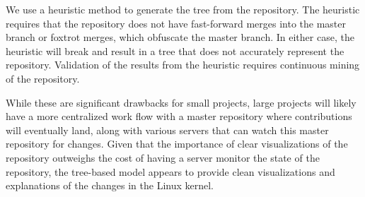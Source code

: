\documentclass[conference, draftclsnofoot, draft]{IEEEtran}
\begin{document}
We use a heuristic method to generate the tree from the repository. The heuristic
requires that the repository does not have fast-forward merges into the master
branch or foxtrot merges, which obfuscate the master branch. In either case, the
heuristic will break and result in a tree that does not accurately represent the
repository. Validation of the results from the heuristic requires continuous mining
of the repository.

While these are significant drawbacks for small projects, large projects will likely
have a more centralized work flow with a master repository where contributions will
eventually land, along with various servers that can watch this master repository
for changes. Given that the importance of clear visualizations of the repository
outweighs the cost of having a server monitor the state of the repository, the
tree-based model appears to provide clean visualizations and explanations of the
changes in the Linux kernel.




\end{document}
